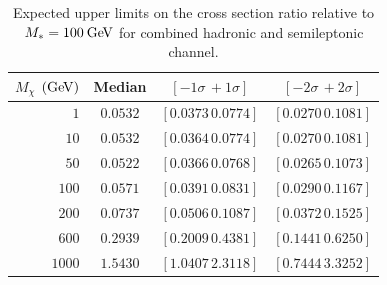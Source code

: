 \begin{table}[!ht]
\centering
\begin{tabular}{|r|c|c|c|}
\hline
  $M_\chi$ $(\mathrm{Ge\kern -0.1em V})$ & Median & $\left[-1\sigma\, +1\sigma\right]$ & $\left[-2\sigma\, +2\sigma\right]$ \\
\hline
  $1$               & $0.0532$ & $\left[0.0373\, 0.0774\right]$ & $\left[0.0270\, 0.1081\right]$ \\
  $10$              & $0.0532$ & $\left[0.0364\, 0.0774\right]$ & $\left[0.0270\, 0.1081\right]$ \\
  $50$              & $0.0522$ & $\left[0.0366\, 0.0768\right]$ & $\left[0.0265\, 0.1073\right]$ \\
  $100$             & $0.0571$ & $\left[0.0391\, 0.0831\right]$ & $\left[0.0290\, 0.1167\right]$ \\
  $200$             & $0.0737$ & $\left[0.0506\, 0.1087\right]$ & $\left[0.0372\, 0.1525\right]$ \\
  $600$             & $0.2939$ & $\left[0.2009\, 0.4381\right]$ & $\left[0.1441\, 0.6250\right]$ \\
  $1000$            & $1.5430$ & $\left[1.0407\, 2.3118\right]$ & $\left[0.7444\, 3.3252\right]$ \\
\hline
\end{tabular}
\caption{Expected upper limits on the cross section ratio relative to $M_*=100\:\mathrm{Ge\kern -0.1em V}$ for combined hadronic and semileptonic channel.}
\label{tab:rLimits_shape}
\end{table}

